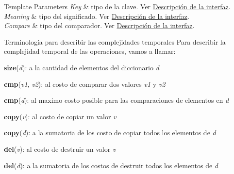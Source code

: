 \begin{DoxyTemplParams}{Template Parameters}
{\em Key} & tipo de la clave. Ver \hyperlink{Interfaz}{Descripción de la interfaz}. \\
\hline
{\em Meaning} & tipo del significado. Ver \hyperlink{Interfaz}{Descripción de la interfaz}. \\
\hline
{\em Compare} & tipo del comparador. Ver \hyperlink{Interfaz}{Descripción de la interfaz}.\\
\hline
\end{DoxyTemplParams}
\begin{DoxyParagraph}{Terminología para describir las complejidades temporales}
Para describir la complejidad temporal de las operaciones, vamos a llamar\-:
\begin{DoxyItemize}
\item {\bfseries size}({\itshape d})\-: a la cantidad de elementos del diccionario {\itshape d} 
\item {\bfseries cmp}({\itshape v1}, {\itshape v2})\-: al costo de comparar dos valores {\itshape v1} y {\itshape v2} 
\item {\bfseries cmp}({\itshape d})\-: al maximo costo posible para las comparaciones de elementos en {\itshape d} 
\item {\bfseries copy}({\itshape v})\-: al costo de copiar un valor {\itshape v} 
\item {\bfseries copy}({\itshape d})\-: a la sumatoria de los costo de copiar todos los elementos de {\itshape d} 
\item {\bfseries del}({\itshape v})\-: al costo de destruir un valor {\itshape v} 
\item {\bfseries del}({\itshape d})\-: a la sumatoria de los costos de destruir todos los elementos de {\itshape d} 
\end{DoxyItemize}
\end{DoxyParagraph}


